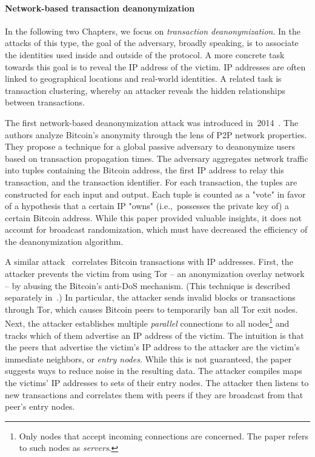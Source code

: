 \paragraph{Network-based transaction deanonymization}

In the following two Chapters, we focus on \textit{transaction deanonymization}.
In the attacks of this type, the goal of the adversary, broadly speaking, is to associate the identities used inside and outside of the protocol.
A more concrete task towards this goal is to reveal the IP address of the victim.
IP addresses are often linked to geographical locations and real-world identities.
A related task is transaction clustering, whereby an attacker reveals the hidden relationships between transactions.

The first network-based deanonymization attack was introduced in~2014~\cite{Koshy2014}.
The authors analyze Bitcoin's anonymity through the lens of P2P network properties.
They propose a technique for a global passive adversary to deanonymize users based on transaction propagation times.
The adversary aggregates network traffic into tuples containing the Bitcoin address, the first IP address to relay this transaction, and the transaction identifier.
For each transaction, the tuples are constructed for each input and output.
Each tuple is counted as a "vote" in favor of a hypothesis that a certain IP "owns" (i.e.,~possesses the private key of) a certain Bitcoin address.
While this paper provided valuable insights, it does not account for broadcast randomization, which must have decreased the efficiency of the deanonymization algorithm.

A similar attack~\cite{Biryukov2014} correlates Bitcoin transactions with IP addresses.
First, the attacker  prevents the victim from using Tor -- an anonymization overlay network -- by abusing the Bitcoin's anti-DoS mechanism.
(This technique is described separately in~\cite{Biryukov2015}.)
In particular, the attacker sends invalid blocks or transactions through Tor, which causes Bitcoin peers to temporarily ban all Tor exit nodes.
Next, the attacker establishes multiple \textit{parallel} connections to all nodes\footnote{Only nodes that accept incoming connections are concerned. The paper refers to such nodes as \textit{servers}.} and tracks which of them advertise an IP address of the victim.
The intuition is that the peers that advertise the victim's IP address to the attacker are the victim's immediate neighbors, or \textit{entry nodes}.
While this is not guaranteed, the paper suggests ways to reduce noise in the resulting data.
The attacker compiles maps the victims' IP addresses to sets of their entry nodes.
The attacker then listens to new transactions and correlates them with peers if they are broadcast from that peer's entry nodes.

